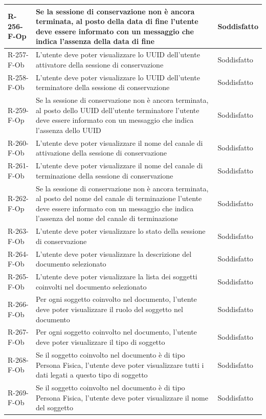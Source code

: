 \begin{longtable}{|p{2.5cm}|p{9.5cm}|p{2.5cm}|}
\hline
R-256-F-Op & Se la sessione di conservazione non è ancora terminata, al posto della data di fine l'utente deve essere informato con un messaggio che indica l'assenza della data di fine & Soddisfatto \\
\hline
R-257-F-Ob & L'utente deve poter visualizzare lo UUID dell'utente attivatore della sessione di conservazione & Soddisfatto \\
\hline
R-258-F-Ob & L'utente deve poter visualizzare lo UUID dell'utente terminatore della sessione di conservazione & Soddisfatto \\
\hline
R-259-F-Op & Se la sessione di conservazione non è ancora terminata, al posto dello UUID dell'utente terminatore l'utente deve essere informato con un messaggio che indica l'assenza dello UUID & Soddisfatto \\
\hline
R-260-F-Ob & L'utente deve poter visualizzare il nome del canale di attivazione della sessione di conservazione & Soddisfatto \\
\hline
R-261-F-Ob & L'utente deve poter visualizzare il nome del canale di terminazione della sessione di conservazione & Soddisfatto \\
\hline
R-262-F-Op & Se la sessione di conservazione non è ancora terminata, al posto del nome del canale di terminazione l'utente deve essere informato con un messaggio che indica l'assenza del nome del canale di terminazione & Soddisfatto \\
\hline
R-263-F-Ob & L'utente deve poter visualizzare lo stato della sessione di conservazione & Soddisfatto \\
\hline
R-264-F-Ob & L'utente deve poter visualizzare la descrizione del documento selezionato & Soddisfatto \\
\hline
R-265-F-Ob & L'utente deve poter visualizzare la lista dei soggetti coinvolti nel documento selezionato & Soddisfatto \\
\hline
R-266-F-Ob & Per ogni soggetto coinvolto nel documento, l'utente deve poter visualizzare il ruolo del soggetto nel documento & Soddisfatto \\
\hline
R-267-F-Ob & Per ogni soggetto coinvolto nel documento, l'utente deve poter visualizzare il tipo di soggetto & Soddisfatto \\
\hline
R-268-F-Ob & Se il soggetto coinvolto nel documento è di tipo Persona Fisica, l'utente deve poter visualizzare tutti i dati legati a questo tipo di soggetto & Soddisfatto \\
\hline
R-269-F-Ob & Se il soggetto coinvolto nel documento è di tipo Persona Fisica, l'utente deve poter visualizzare il nome del soggetto & Soddisfatto \\

\end{longtable}
